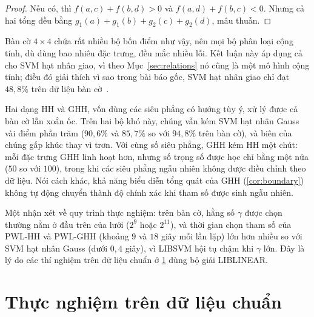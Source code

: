 \begin{proof}
Nếu có, thì $f(a,c)+f(b,d)>0$ và $f(a,d)+f(b,c)<0$. Nhưng cả hai tổng đều bằng $g_1(a)+g_1(b)+g_2(c)+g_2(d)$, mâu thuẫn.
\end{proof}

Bàn cờ $4\times4$ chứa rất nhiều bộ bốn điểm như vậy, nên mọi bộ phân loại cộng tính, dù dùng bao nhiêu đặc trưng, đều mắc nhiều lỗi. Kết luận này áp dụng cả cho SVM hạt nhân giao, vì theo Mục~\ref{sec:relations} nó cũng là một mô hình cộng tính; điều đó giải thích vì sao trong bài báo gốc, SVM hạt nhân giao chỉ đạt $48{,}8\%$ trên dữ liệu bàn cờ~\cite[Bảng~1]{huang2013}.

Hai dạng HH và GHH, vốn dùng các siêu phẳng có hướng tùy ý, xử lý được cả bàn cờ lẫn xoắn ốc. Trên hai bộ khó này, chúng vẫn kém SVM hạt nhân Gauss vài điểm phần trăm ($90{,}6\%$ và $85{,}7\%$ so với $94{,}8\%$ trên bàn cờ), và biên của chúng gấp khúc thay vì trơn. Với cùng số siêu phẳng, GHH kém HH một chút: mỗi đặc trưng GHH linh hoạt hơn, nhưng số trọng số được học chỉ bằng một nửa ($50$ so với $100$), trong khi các siêu phẳng ngẫu nhiên không được điều chỉnh theo dữ liệu. Nói cách khác, khả năng biểu diễn tổng quát của GHH (\cref{cor:boundary}) không tự động chuyển thành độ chính xác khi tham số được sinh ngẫu nhiên.

Một nhận xét về quy trình thực nghiệm: trên bàn cờ, hằng số $\gamma$ được chọn thường nằm ở đầu trên của lưới ($2^{9}$ hoặc $2^{11}$), và thời gian chọn tham số của PWL-HH và PWL-GHH (khoảng $9$ và $18$ giây mỗi lần lặp) lớn hơn nhiều so với SVM hạt nhân Gauss (dưới $0{,}4$ giây), vì LIBSVM hội tụ chậm khi $\gamma$ lớn. Đây là lý do các thí nghiệm trên dữ liệu chuẩn ở \cref{sec:benchmark} dùng bộ giải LIBLINEAR.


\section{Thực nghiệm trên dữ liệu chuẩn}\label{sec:benchmark}





